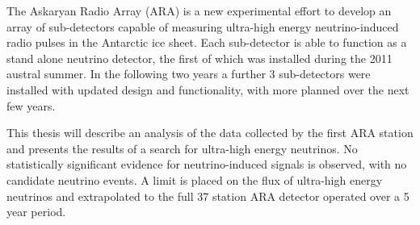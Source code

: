 The Askaryan Radio Array (ARA) is a new experimental effort to develop an array of sub-detectors capable of measuring ultra-high energy neutrino-induced radio pulses in the Antarctic ice sheet. Each sub-detector is able to function as a stand alone neutrino detector, the first of which was installed during the 2011 austral summer. In the following two years a further 3 sub-detectors were installed with updated design and functionality, with more planned over the next few years.

This thesis will describe an analysis of the data collected by the first ARA station and presents the results of a search for ultra-high energy neutrinos. No statistically significant evidence for neutrino-induced signals is observed, with no candidate neutrino events. A limit is placed on the flux of ultra-high energy neutrinos and extrapolated to the full 37 station ARA detector operated over a 5 year period.
